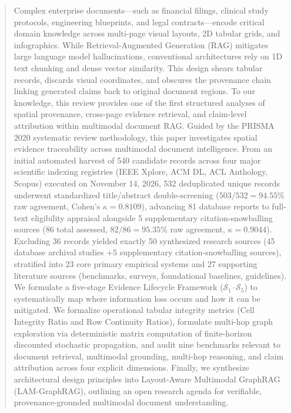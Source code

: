 \documentclass[conference,a4paper]{IEEEtran}
\begin{document}
\begin{abstract}
\mdseries
Complex enterprise documents---such as financial filings, clinical study protocols, engineering blueprints, and legal contracts---encode critical domain knowledge across multi-page visual layouts, 2D tabular grids, and infographics. While Retrieval-Augmented Generation (RAG) mitigates large language model hallucinations, conventional architectures rely on 1D text chunking and dense vector similarity. This design shears tabular records, discards visual coordinates, and obscures the provenance chain linking generated claims back to original document regions. To our knowledge, this review provides one of the first structured analyses of spatial provenance, cross-page evidence retrieval, and claim-level attribution within multimodal document RAG. Guided by the PRISMA 2020 systematic review methodology, this paper investigates spatial evidence traceability across multimodal document intelligence. From an initial automated harvest of 540 candidate records across four major scientific indexing registries (IEEE Xplore, ACM DL, ACL Anthology, Scopus) executed on November 14, 2026, 532 deduplicated unique records underwent standardized title/abstract double-screening ($503/532 = 94.55\%$ raw agreement, Cohen's $\kappa = 0.8109$), advancing 81 database reports to full-text eligibility appraisal alongside 5 supplementary citation-snowballing sources (86 total assessed, $82/86 = 95.35\%$ raw agreement, $\kappa = 0.9044$). Excluding 36 records yielded exactly 50 synthesized research sources (45 database archival studies $+ 5$ supplementary citation-snowballing sources), stratified into 23 core primary empirical systems and 27 supporting literature sources (benchmarks, surveys, foundational baselines, guidelines). We formulate a five-stage Evidence Lifecycle Framework ($\mathcal{S}_1$--$\mathcal{S}_5$) to systematically map where information loss occurs and how it can be mitigated. We formalize operational tabular integrity metrics (Cell Integrity Ratio and Row Continuity Ratios), formulate multi-hop graph exploration via deterministic matrix computation of finite-horizon discounted stochastic propagation, and audit nine benchmarks relevant to document retrieval, multimodal grounding, multi-hop reasoning, and claim attribution across four explicit dimensions. Finally, we synthesize architectural design principles into Layout-Aware Multimodal GraphRAG (LAM-GraphRAG), outlining an open research agenda for verifiable, provenance-grounded multimodal document understanding.
\end{abstract}
\end{document}
